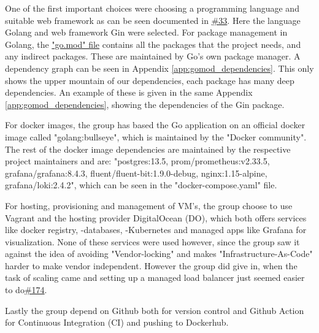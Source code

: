 
One of the first important choices were choosing a programming language and suitable web framework as can be seen documented in \href{https://github.com/DevelOpsITU/MiniTwit/issues/33}{\#33}. Here the language Golang and web framework Gin were selected. For package management in Golang, the \href{https://github.com/DevelOpsITU/MiniTwit/blob/main/go.mod}{"go.mod" file} contains all the packages that the project needs, and any indirect packages. These are maintained by Go's own package manager. A dependency graph can be seen in Appendix \ref{app:gomod_dependencies}. This only shows the upper mountain of our dependencies, each package has many deep dependencies. An example of these is given in the same Appendix \ref{app:gomod_dependencies}, showing the dependencies of the Gin package.

For docker images, the group has based the Go application on an official docker image called "golang:bullseye", which is maintained by the "Docker community"\cite{docker_go_image}. The rest of the docker image dependencies are maintained by the respective project maintainers and are: "postgres:13.5, prom/prometheus:v2.33.5, grafana/grafana:8.4.3, fluent/fluent-bit:1.9.0-debug, nginx:1.15-alpine, grafana/loki:2.4.2", which can be seen in the "docker-compose.yaml"\cite{github_minitwit_dockercompose} file.

For hosting, provisioning and management of VM's, the group choose to use Vagrant and the hosting provider DigitalOcean (DO), which both offers services like docker registry, -databases, -Kubernetes and managed apps like Grafana for visualization. None of these services were used however, since the group saw it against the idea of avoiding "Vendor-locking" and makes "Infrastructure-As-Code" harder to make vendor independent. However the group did give in, when the task of scaling came and setting up a managed load balancer just seemed easier to do\href{https://github.com/DevelOpsITU/MiniTwit/issues/174}{\#174}. 

Lastly the group depend on Github both for version control and Github Action for Continuous Integration (CI) and pushing to Dockerhub. 


